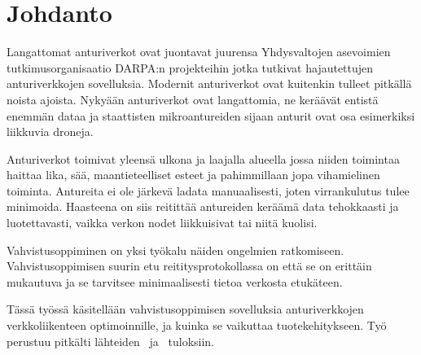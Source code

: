 \section{Johdanto}
Langattomat anturiverkot ovat juontavat juurensa Yhdysvaltojen asevoimien
tutkimusorganisaatio DARPA:n projekteihin jotka tutkivat hajautettujen
anturiverkkojen sovelluksia. Modernit anturiverkot ovat kuitenkin tulleet
pitkällä noista ajoista. Nykyään anturiverkot ovat langattomia, ne keräävät
entistä enemmän dataa ja staattisten mikroantureiden sijaan anturit ovat osa
esimerkiksi liikkuvia droneja.

Anturiverkot toimivat yleensä ulkona ja laajalla alueella jossa niiden
toimintaa haittaa lika, sää, maantieteelliset esteet ja pahimmillaan jopa
vihamielinen toiminta. Antureita ei ole järkevä ladata manuaalisesti, joten
virrankulutus tulee minimoida. Haasteena on siis reitittää antureiden keräämä
data tehokkaasti ja luotettavasti, vaikka verkon nodet liikkuisivat tai niitä
kuolisi.

Vahvistusoppiminen on yksi työkalu näiden ongelmien ratkomiseen.
Vahvistusoppimisen suurin etu reititysprotokollassa on että se on erittäin
mukautuva ja se tarvitsee minimaalisesti tietoa verkosta etukäteen.

Tässä työssä käsitellään vahvistusoppimisen sovelluksia anturiverkkojen
verkkoliikenteen optimoinnille, ja kuinka se vaikuttaa tuotekehitykseen. Työ
perustuu pitkälti lähteiden~\cite{Arya2015} ja~\cite{Yu2006} tuloksiin.
